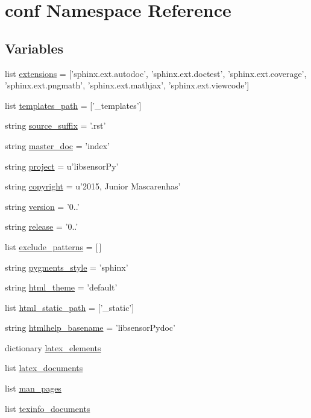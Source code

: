 \hypertarget{namespaceconf}{}\section{conf Namespace Reference}
\label{namespaceconf}
\subsection*{Variables}
\begin{DoxyCompactItemize}
\item 
list \hyperlink{namespaceconf_ae475e080536acb271a0a0efe56c3ba42}{extensions} = \mbox{[}'sphinx.\+ext.\+autodoc', 'sphinx.\+ext.\+doctest', 'sphinx.\+ext.\+coverage', 'sphinx.\+ext.\+pngmath', 'sphinx.\+ext.\+mathjax', 'sphinx.\+ext.\+viewcode'\mbox{]}
\item 
list \hyperlink{namespaceconf_ae850ae634911b713e036b43894fdd525}{templates\+\_\+path} = \mbox{[}'\+\_\+templates'\mbox{]}
\item 
string \hyperlink{namespaceconf_a10af2a769eb3bd3322e874f677e435b1}{source\+\_\+suffix} = '.rst'
\item 
string \hyperlink{namespaceconf_a6fcd7e5236f355b1e1a55f9d95988810}{master\+\_\+doc} = 'index'
\item 
string \hyperlink{namespaceconf_a45653c983098153b78e33600e39230eb}{project} = u'libsensor\+Py'
\item 
string \hyperlink{namespaceconf_a33fa97cf51dcb25970fbf53f10159589}{copyright} = u'2015, Junior Mascarenhas'
\item 
string \hyperlink{namespaceconf_ade15c5b54093b64d7c428ec19ca5b1cb}{version} = '0..'
\item 
string \hyperlink{namespaceconf_a325dc746d8bf05c54d26351c35a21d90}{release} = '0..'
\item 
list \hyperlink{namespaceconf_a7ad48fb6f3e9b129c02346ea0d3527c1}{exclude\+\_\+patterns} = \mbox{[}$\,$\mbox{]}
\item 
string \hyperlink{namespaceconf_a641130e096b26cba8a5d63ed38684de7}{pygments\+\_\+style} = 'sphinx'
\item 
string \hyperlink{namespaceconf_a6c3bfcc1a44546c1c75ce20f55bd0fd6}{html\+\_\+theme} = 'default'
\item 
list \hyperlink{namespaceconf_af4fb5d8851ccaade135c2668dd3ced41}{html\+\_\+static\+\_\+path} = \mbox{[}'\+\_\+static'\mbox{]}
\item 
string \hyperlink{namespaceconf_aab7fddb2766ce3c430d8246fbfdbc7b1}{htmlhelp\+\_\+basename} = 'libsensor\+Pydoc'
\item 
dictionary \hyperlink{namespaceconf_a33619d385ad23765ac6ebb58bf82d43d}{latex\+\_\+elements}
\item 
list \hyperlink{namespaceconf_a7812f49970f3de0d15dd7b9b9a10e3a1}{latex\+\_\+documents}
\item 
list \hyperlink{namespaceconf_a85efc5fee48a26fa2d651f6eeb38fc2b}{man\+\_\+pages}
\item 
list \hyperlink{namespaceconf_a54b0faed214ac92017d5689efbb10672}{texinfo\+\_\+documents}
\end{DoxyCompactItemize}


